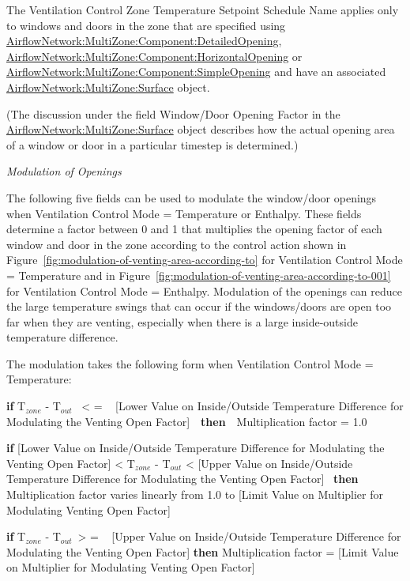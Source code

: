 The Ventilation Control Zone Temperature Setpoint Schedule Name applies only to windows and doors in the zone that are specified using \hyperref[airflownetworkmultizonecomponentdetailedopening]{AirflowNetwork:MultiZone:Component:DetailedOpening}, \hyperref[airflownetworkmultizonecomponenthorizontalopening]{AirflowNetwork:MultiZone:Component:HorizontalOpening} or \hyperref[airflownetworkmultizonecomponentsimpleopening]{AirflowNetwork:MultiZone:Component:SimpleOpening} and have an associated \hyperref[airflownetworkmultizonesurface]{AirflowNetwork:MultiZone:Surface} object.

(The discussion under the field Window/Door Opening Factor in the \hyperref[airflownetworkmultizonesurface]{AirflowNetwork:MultiZone:Surface} object describes how the actual opening area of a window or door in a particular timestep is determined.)

\emph{Modulation of Openings}

The following five fields can be used to modulate the window/door openings when Ventilation Control Mode = Temperature or Enthalpy. These fields determine a factor between 0 and 1 that multiplies the opening factor of each window and door in the zone according to the control action shown in Figure~\ref{fig:modulation-of-venting-area-according-to} for Ventilation Control Mode = Temperature and in Figure~\ref{fig:modulation-of-venting-area-according-to-001} for Ventilation Control Mode = Enthalpy. Modulation of the openings can reduce the large temperature swings that can occur if the windows/doors are open too far when they are venting, especially when there is a large inside-outside temperature difference.

The modulation takes the following form when Ventilation Control Mode = Temperature:

\textbf{if} T\(_{zone}\) - T\(_{out}\) ~\textless{} = ~ {[}Lower Value on Inside/Outside Temperature Difference for Modulating the Venting Open Factor{]}~~\textbf{then}~~Multiplication factor = 1.0

\textbf{if} {[}Lower Value on Inside/Outside Temperature Difference for Modulating the Venting Open Factor{]} \textless{} T\(_{zone}\) - T\(_{out}\) \textless{} {[}Upper Value on Inside/Outside Temperature Difference for Modulating the Venting Open Factor{]}~ \textbf{then} Multiplication factor varies linearly from 1.0 to {[}Limit Value on Multiplier for Modulating Venting Open Factor{]}

\textbf{if} T\(_{zone}\) - T\(_{out}\)~\textgreater{} = ~ {[}Upper Value on Inside/Outside Temperature Difference for Modulating the Venting Open Factor{]} \textbf{then} Multiplication factor = {[}Limit Value on Multiplier for Modulating Venting Open Factor{]}

